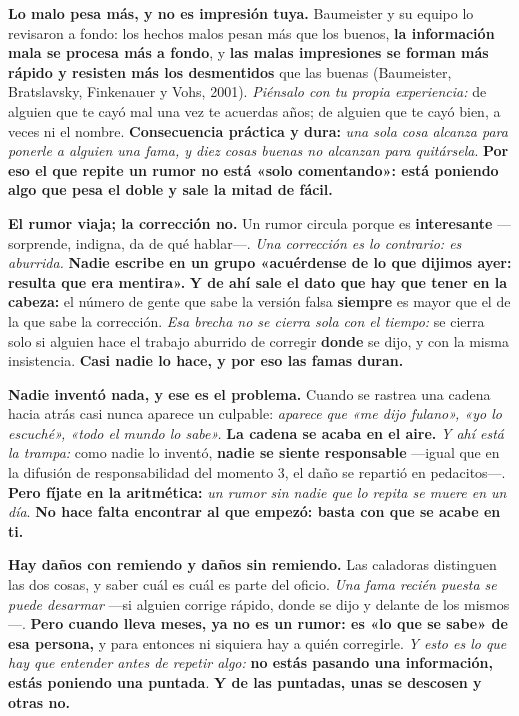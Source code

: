 \documentclass[11pt,letterpaper]{article}
\newcommand{\milcpaso}[3]{%
\Needspace{4\baselineskip}%
\begin{tcolorbox}[enhanced,colback=white,colframe=milcLinea,arc=1.5mm,boxrule=.9pt,
  left=14mm,right=4mm,top=3mm,bottom=3mm,before skip=4pt,after skip=4pt,
  fontupper=\RaggedRight,
  overlay={\node[anchor=north west,circle,fill=#2,text=white,inner sep=0pt,
    minimum size=7.4mm,font=\sffamily\bfseries\small]
    at ([xshift=3.6mm,yshift=-3.2mm]frame.north west) {#1};}]
#3
\end{tcolorbox}}
\begin{document}
\milcpaso{1}{milcTurquesa}{\textbf{Lo malo pesa más, y no es impresión tuya.} Baumeister y su equipo lo revisaron a fondo: los hechos malos pesan más que los buenos, \textbf{la información mala se procesa más a fondo}, y \textbf{las malas impresiones se forman más rápido y resisten más los desmentidos} que las buenas (Baumeister, Bratslavsky, Finkenauer y Vohs, 2001). \emph{Piénsalo con tu propia experiencia:} de alguien que te cayó mal una vez te acuerdas años; de alguien que te cayó bien, a veces ni el nombre. \textbf{Consecuencia práctica y dura:} \emph{una sola cosa alcanza para ponerle a alguien una fama, y diez cosas buenas no alcanzan para quitársela}. \textbf{Por eso el que repite un rumor no está «solo comentando»: está poniendo algo que pesa el doble y sale la mitad de fácil.}}
\milcpaso{2}{milcTurquesa}{\textbf{El rumor viaja; la corrección no.} Un rumor circula porque es \textbf{interesante} ---sorprende, indigna, da de qué hablar---. \emph{Una corrección es lo contrario: es aburrida.} \textbf{Nadie escribe en un grupo «acuérdense de lo que dijimos ayer: resulta que era mentira».} \textbf{Y de ahí sale el dato que hay que tener en la cabeza:} el número de gente que sabe la versión falsa \textbf{siempre} es mayor que el de la que sabe la corrección. \emph{Esa brecha no se cierra sola con el tiempo:} se cierra solo si alguien hace el trabajo aburrido de corregir \textbf{donde} se dijo, y con la misma insistencia. \textbf{Casi nadie lo hace, y por eso las famas duran.}}
\milcpaso{3}{milcTurquesa}{\textbf{Nadie inventó nada, y ese es el problema.} Cuando se rastrea una cadena hacia atrás casi nunca aparece un culpable: \emph{aparece que «me dijo fulano», «yo lo escuché», «todo el mundo lo sabe».} \textbf{La cadena se acaba en el aire.} \emph{Y ahí está la trampa:} como nadie lo inventó, \textbf{nadie se siente responsable} ---igual que en la difusión de responsabilidad del momento 3, el daño se repartió en pedacitos---. \textbf{Pero fíjate en la aritmética:} \emph{un rumor sin nadie que lo repita se muere en un día}. \textbf{No hace falta encontrar al que empezó: basta con que se acabe en ti.}}
\milcpaso{4}{milcTurquesa}{\textbf{Hay daños con remiendo y daños sin remiendo.} Las caladoras distinguen las dos cosas, y saber cuál es cuál es parte del oficio. \emph{Una fama recién puesta se puede desarmar} ---si alguien corrige rápido, donde se dijo y delante de los mismos---. \textbf{Pero cuando lleva meses, ya no es un rumor: es «lo que se sabe» de esa persona,} y para entonces ni siquiera hay a quién corregirle. \emph{Y esto es lo que hay que entender antes de repetir algo:} \textbf{no estás pasando una información, estás poniendo una puntada}. \textbf{Y de las puntadas, unas se descosen y otras no.}}
\end{document}
